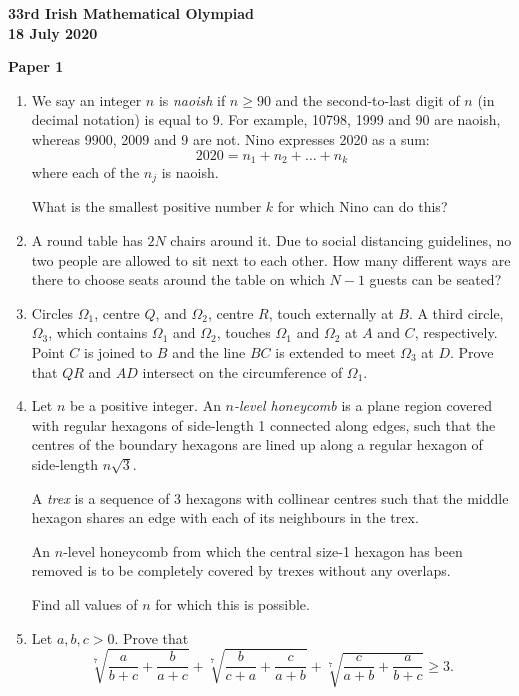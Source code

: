 \documentclass[12pt]{article}
\begin{document}
\begin{center}
{\large\bfseries 33rd Irish Mathematical Olympiad\\18 July 2020}
\end{center}
\bigskip\noindent\textbf{Paper 1}\bigskip
\begin{enumerate}
\item We say an integer $n$ is \textit{naoish} if $n \ge 90$ and the second-to-last digit of $n$ (in decimal notation) is equal to 9. For example, 10798, 1999 and 90 are naoish, whereas 9900, 2009 and 9 are not. Nino expresses 2020 as a sum:
\[
2020 = n_1 + n_2 + \ldots + n_k
\]
where each of the $n_j$ is naoish.

What is the smallest positive number $k$ for which Nino can do this?

\item A round table has $2N$ chairs around it. Due to social distancing guidelines, no two people are allowed to sit next to each other. How many different ways are there to choose seats around the table on which $N - 1$ guests can be seated?

\item Circles $\Omega_1$, centre $Q$, and $\Omega_2$, centre $R$, touch externally at $B$. A third circle, $\Omega_3$, which contains $\Omega_1$ and $\Omega_2$, touches $\Omega_1$ and $\Omega_2$ at $A$ and $C$, respectively. Point $C$ is joined to $B$ and the line $BC$ is extended to meet $\Omega_3$ at $D$. Prove that $QR$ and $AD$ intersect on the circumference of $\Omega_1$.

\item Let $n$ be a positive integer. An \textit{$n$-level honeycomb} is a plane region covered with regular hexagons of side-length 1 connected along edges, such that the centres of the boundary hexagons are lined up along a regular hexagon of side-length $n\sqrt{3}$.

A \textit{trex} is a sequence of 3 hexagons with collinear centres such that the middle hexagon shares an edge with each of its neighbours in the trex.

An $n$-level honeycomb from which the central size-1 hexagon has been removed is to be completely covered by trexes without any overlaps.

Find all values of $n$ for which this is possible.

\item Let $a, b, c > 0$. Prove that
\[
\sqrt[7]{\frac{a}{b+c} + \frac{b}{a+c}} + \sqrt[7]{\frac{b}{c+a} + \frac{c}{a+b}} + \sqrt[7]{\frac{c}{a+b} + \frac{a}{b+c}} \ge 3.
\]
\end{enumerate}
\end{document}
